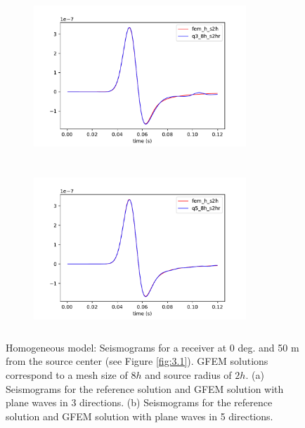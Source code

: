  \begin{figure}[h!]
 		\centering
		\begin{subfigure}{8cm}
				\includegraphics[width=8cm, height=6cm]{Thesis_Edith/figures/homo/homo_waves/fem_q3_8h_2hr_r50_0deg.pdf}
			     \caption{}
		\end{subfigure}
        \hspace{0.25cm}
		\begin{subfigure}{8cm}
				\includegraphics[width=8cm, height=6cm]{Thesis_Edith/figures/homo/homo_waves/fem_q5_8h_2hr_r50_0deg.pdf}
			   \caption{}
		\end{subfigure}
 
	\caption{Homogeneous model: Seismograms for a receiver at 0 deg. and 50 m from the source center (see Figure \ref{fig:3.1}). GFEM solutions correspond to a mesh size of $8h$ and source radius of $2h$. (a) Seismograms for the reference solution and GFEM solution with plane waves in 3 directions. (b) Seismograms for the  reference solution and GFEM solution with plane waves in 5 directions.}  
	\label{fig:3.6}
\end{figure}


